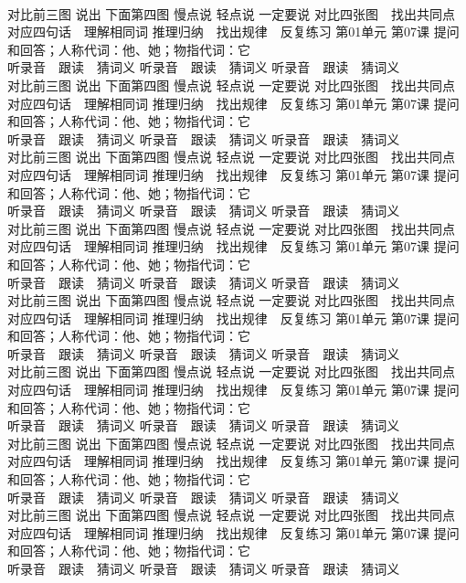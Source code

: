 \documentclass[8pt]{extreport}
\begin{document}
\begin{CJK}{UTF8}{min}
\\	对比前三图 说出 下面第四图 慢点说 轻点说 一定要说	对比四张图　找出共同点 对应四句话　理解相同词 推理归纳　找出规律　反复练习 第01单元 第07课 提问和回答；人称代词：他、她；物指代词：它
\\	听录音　跟读　猜词义 听录音　跟读　猜词义 听录音　跟读　猜词义 
\\	对比前三图 说出 下面第四图 慢点说 轻点说 一定要说	对比四张图　找出共同点 对应四句话　理解相同词 推理归纳　找出规律　反复练习 第01单元 第07课 提问和回答；人称代词：他、她；物指代词：它
\\	听录音　跟读　猜词义 听录音　跟读　猜词义 听录音　跟读　猜词义 
\\	对比前三图 说出 下面第四图 慢点说 轻点说 一定要说	对比四张图　找出共同点 对应四句话　理解相同词 推理归纳　找出规律　反复练习 第01单元 第07课 提问和回答；人称代词：他、她；物指代词：它
\\	听录音　跟读　猜词义 听录音　跟读　猜词义 听录音　跟读　猜词义 
\\	对比前三图 说出 下面第四图 慢点说 轻点说 一定要说	对比四张图　找出共同点 对应四句话　理解相同词 推理归纳　找出规律　反复练习 第01单元 第07课 提问和回答；人称代词：他、她；物指代词：它
\\	听录音　跟读　猜词义 听录音　跟读　猜词义 听录音　跟读　猜词义 
\\	对比前三图 说出 下面第四图 慢点说 轻点说 一定要说	对比四张图　找出共同点 对应四句话　理解相同词 推理归纳　找出规律　反复练习 第01单元 第07课 提问和回答；人称代词：他、她；物指代词：它
\\	听录音　跟读　猜词义 听录音　跟读　猜词义 听录音　跟读　猜词义 
\\	对比前三图 说出 下面第四图 慢点说 轻点说 一定要说	对比四张图　找出共同点 对应四句话　理解相同词 推理归纳　找出规律　反复练习 第01单元 第07课 提问和回答；人称代词：他、她；物指代词：它
\\	听录音　跟读　猜词义 听录音　跟读　猜词义 听录音　跟读　猜词义 
\\	对比前三图 说出 下面第四图 慢点说 轻点说 一定要说	对比四张图　找出共同点 对应四句话　理解相同词 推理归纳　找出规律　反复练习 第01单元 第07课 提问和回答；人称代词：他、她；物指代词：它
\\	听录音　跟读　猜词义 听录音　跟读　猜词义 听录音　跟读　猜词义 
\\	对比前三图 说出 下面第四图 慢点说 轻点说 一定要说	对比四张图　找出共同点 对应四句话　理解相同词 推理归纳　找出规律　反复练习 第01单元 第07课 提问和回答；人称代词：他、她；物指代词：它
\\	听录音　跟读　猜词义 听录音　跟读　猜词义 听录音　跟读　猜词义 

\end{CJK}
\end{document}
